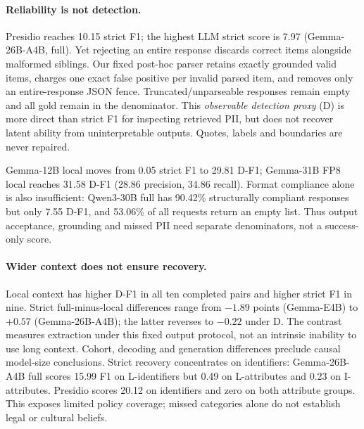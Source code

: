 \paragraph{Reliability is not detection.}
Presidio reaches 10.15 strict F1; the highest LLM strict score is 7.97 (Gemma-26B-A4B, full). Yet rejecting an entire response discards correct items alongside malformed siblings. Our fixed post-hoc parser retains exactly grounded valid items, charges one exact false positive per invalid parsed item, and removes only an entire-response JSON fence. Truncated/unparseable responses remain empty and all gold remain in the denominator. This \emph{observable detection proxy} (D) is more direct than strict F1 for inspecting retrieved PII, but does not recover latent ability from uninterpretable outputs. Quotes, labels and boundaries are never repaired.

Gemma-12B local moves from 0.05 strict F1 to 29.81 D-F1; Gemma-31B FP8 local reaches 31.58 D-F1 (28.86 precision, 34.86 recall). Format compliance alone is also insufficient: Qwen3-30B full has 90.42\% structurally compliant responses but only 7.55 D-F1, and 53.06\% of all requests return an empty list. Thus output acceptance, grounding and missed PII need separate denominators, not a success-only score.

\paragraph{Wider context does not ensure recovery.}
Local context has higher D-F1 in all ten completed pairs and higher strict F1 in nine. Strict full-minus-local differences range from $-1.89$ points (Gemma-E4B) to $+0.57$ (Gemma-26B-A4B); the latter reverses to $-0.22$ under D. The contrast measures extraction under this fixed output protocol, not an intrinsic inability to use long context. Cohort, decoding and generation differences preclude causal model-size conclusions. Strict recovery concentrates on identifiers: Gemma-26B-A4B full scores 15.99 F1 on L-identifiers but 0.49 on L-attributes and 0.23 on I-attributes. Presidio scores 20.12 on identifiers and zero on both attribute groups. This exposes limited policy coverage; missed categories alone do not establish legal or cultural beliefs.
